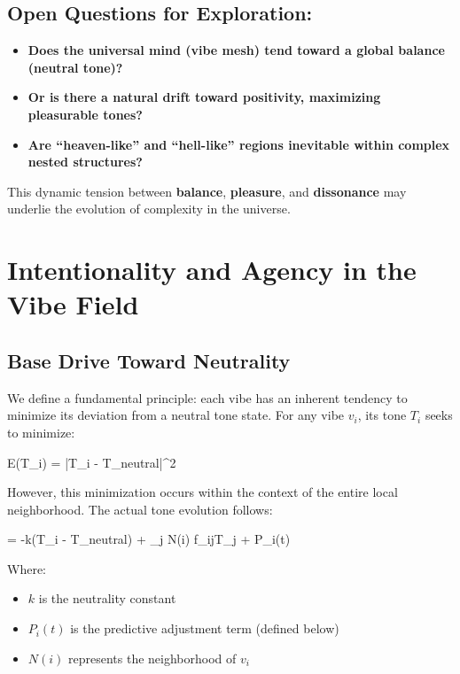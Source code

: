 \documentclass{article}
\let\oldequation\equation
\let\endoldequation\endequation
\renewenvironment{equation}{%
    \noindent\vspace{-\parskip}\vspace{-\baselineskip}%
    \oldequation
}{%
    \endoldequation
    \noindent\vspace{-\parskip}\vspace{-\baselineskip}%
}
\theoremstyle{definition}
\begin{document}
\subsection{Open Questions for Exploration:}

\begin{itemize}
\item \textbf{Does the universal mind (vibe mesh) tend toward a global balance (neutral tone)?}
\item \textbf{Or is there a natural drift toward positivity, maximizing pleasurable tones?}
\item \textbf{Are \enquote{heaven-like} and \enquote{hell-like} regions inevitable within complex nested structures?}
\end{itemize}

This dynamic tension between \textbf{balance}, \textbf{pleasure}, and \textbf{dissonance} may underlie the evolution of complexity in the universe.

\section{Intentionality and Agency in the Vibe Field}

\subsection{Base Drive Toward Neutrality}

We define a fundamental principle: each vibe has an inherent tendency to minimize its deviation from a neutral tone state. For any vibe $v_i$, its tone $T_i$ seeks to minimize:

\begin{equation}
E(T_i) = |T_i - T_{neutral}|^2
\end{equation}

However, this minimization occurs within the context of the entire local neighborhood. The actual tone evolution follows:

\begin{equation}
 = -k(T_i - T_{neutral}) + \sum_{j \in N(i)} f_{ij}T_j + P_i(t)
\end{equation}

Where:
\begin{itemize}
\item $k$ is the neutrality constant
\item $P_i(t)$ is the predictive adjustment term (defined below)
\item $N(i)$ represents the neighborhood of $v_i$
\end{itemize}
\end{document}
